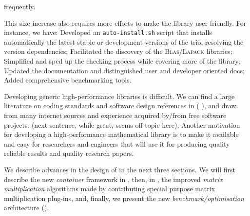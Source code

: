 frequently.
%
\par
%
This size increase also requires more efforts to make the library user friendly. For
instance, we have:
%
Developed an \texttt{auto-install.sh} script that installs automatically the
latest stable or development versions of the trio, resolving the version
dependencies;
%
Facilitated the discovery of the \textsc{Blas}/\textsc{Lapack} libraries;
%
Simplified and sped up the checking process while covering more of the library;
%
Updated the documentation and distinguished user and developer oriented docs;
%
Added comprehensive benchmarking tools.
%
%
\par
%
Developing generic high-performance libraries is difficult. We can find a
large literature on coding standards and software design references in (\cf{}
\cite{alexandrescu:01:modern,gamma:95:design,sutter:05:cpp,stroustrup1994design,Douglas:05:GPHP}),
and draw from many internet sources and experience acquired by/from free
software projects.
(\danger next sentence, while great, seems off topic here);
Another motivation for developing a high-performance
mathematical library is to make it available and easy for researchers and
engineers that will use it for producing quality reliable results and quality
research papers.
%
\par
%
We describe advances in the design of \linbox in the next
three sections. We will first describe the new \emph{container} framework in
, then, 
in ,
the improved \emph{matrix multiplication} algorithms
made by contributing special purpose matrix multiplication plug-ins, and, finally, we present the new \emph{benchmark/optimisation}
architecture ().
%
\par
